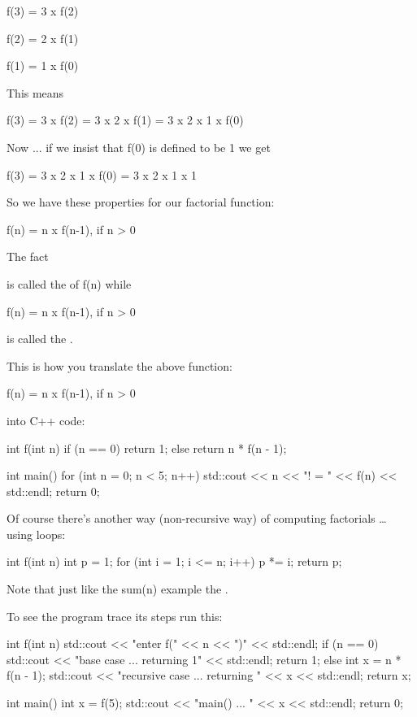 f(3) = 3 x f(2)

f(2) = 2 x f(1)

f(1) = 1 x f(0)

This means

f(3) = 3 x f(2) = 3 x 2 x f(1) = 3 x 2 x 1 x f(0)

Now ... if we insist that f(0) is defined to be 1 we get

f(3) = 3 x 2 x 1 x f(0) = 3 x 2 x 1 x 1

So we have these properties for our factorial function:

f(n) = n x f(n-1), if n > 0


The fact


is called the  of f(n) while

f(n) = n x f(n-1), if n > 0

is called the .

This is how you translate the above function:

f(n) = n x f(n-1), if n > 0


into C++ code:

\begin{consolethree}[escapeinside=||]
int f(int n)
{
    if (n == 0)
        return 1;
    else
        return n * f(n - 1);
}

int main()
{
    for (int n = 0; n < 5; n++)
    {
        std::cout << n << "! = " << f(n)
                  << std::endl;
    }
    return 0;
}
\end{consolethree}

Of course there's another way (non-recursive way) of
computing factorials \ldots{} using loops:

\begin{consolethree}[escapeinside=||]
int f(int n)
{
    int p = 1;
    for (int i = 1; i <= n; i++)
    {
        p *= i;
    }
    return p;
}
\end{consolethree}

Note that just like the sum(n) example the .

To see the program trace its steps run this:

\begin{consolethree}[escapeinside=||]
int f(int n)
{
    std::cout << "enter f(" << n << ")" << std::endl;
    if (n == 0)
    {
        std::cout << "base case ... returning 1"
                  << std::endl;
        return 1;
    }
    else
    {
        int x = n * f(n - 1);
        std::cout << "recursive case ... returning "
                  << x << std::endl;
        return x;
    }
}

int main()
{
    int x = f(5);
    std::cout << "main() ... " << x << std::endl;
    return 0;
}
\end{consolethree}

